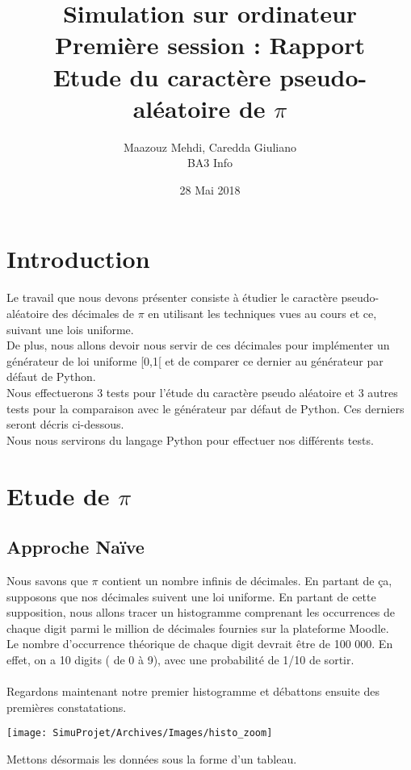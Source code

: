 \documentclass[french]{article}
\title{Simulation sur ordinateur \\ Première session : Rapport \\ Etude du caractère pseudo-aléatoire de $\pi$}
\author{Maazouz Mehdi, Caredda Giuliano \\ BA3 Info}
\date{28 Mai 2018}
\begin{document}
\maketitle
\newpage
\renewcommand{\contentsname}{Sommaire}
\tableofcontents
\newpage

\section{Introduction}
Le travail que nous devons présenter consiste à étudier le caractère pseudo-aléatoire des décimales de $\pi$
en utilisant les techniques vues au cours et ce, suivant une lois uniforme. \\
De plus, nous allons devoir nous servir de ces décimales pour implémenter un générateur de loi uniforme [0,1[ 
et de comparer ce dernier au générateur par défaut de Python. \\
Nous effectuerons 3 tests pour l'étude du caractère pseudo aléatoire et 3 autres tests pour la comparaison avec le générateur par défaut de Python. Ces derniers seront décris ci-dessous. \\
Nous nous servirons du langage Python pour effectuer nos différents tests.

\section{Etude de $\pi$ }
\subsection{Approche Naïve}
Nous savons que $\pi$ contient un nombre infinis de décimales. En partant de ça, supposons que nos décimales suivent une loi uniforme. En partant de cette supposition, nous allons tracer un histogramme comprenant les occurrences de chaque digit parmi le million de décimales fournies sur la plateforme Moodle.
\\
Le nombre d'occurrence théorique de chaque digit devrait être de 100 000. En effet, on a 10 digits ( de 0 à 9), avec une probabilité de 1/10 de sortir.
\\
\\
Regardons maintenant notre premier histogramme et débattons ensuite des premières constatations.

\begin{center}
	\texttt{[image: SimuProjet/Archives/Images/histo\_zoom]}
\end{center}

Mettons désormais les données sous la forme d'un tableau.
\end{document}
